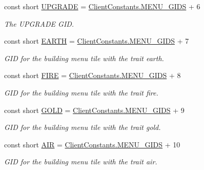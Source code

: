\begin{DoxyCompactItemize}
const short \hyperlink{classClient_1_1Common_1_1Constants_1_1BuildingMenuGid_a1bfbcae011676ac021301688aec0fb04}{U\+P\+G\+R\+A\+D\+E} = \hyperlink{classClient_1_1Common_1_1Constants_1_1ClientConstants_a4d3b0e4f36481c991c9995cb20c9347d}{Client\+Constants.\+M\+E\+N\+U\+\_\+\+G\+I\+D\+S} + 6
\begin{DoxyCompactList}\small\item\em The U\+P\+G\+R\+A\+D\+E G\+I\+D. \end{DoxyCompactList}\item 
const short \hyperlink{classClient_1_1Common_1_1Constants_1_1BuildingMenuGid_a8d1308488d4c82b22076bb64b16fbfdd}{E\+A\+R\+T\+H} = \hyperlink{classClient_1_1Common_1_1Constants_1_1ClientConstants_a4d3b0e4f36481c991c9995cb20c9347d}{Client\+Constants.\+M\+E\+N\+U\+\_\+\+G\+I\+D\+S} + 7
\begin{DoxyCompactList}\small\item\em G\+I\+D for the building menu tile with the trait earth. \end{DoxyCompactList}\item 
const short \hyperlink{classClient_1_1Common_1_1Constants_1_1BuildingMenuGid_a31920e3fef30931467501afb53df9404}{F\+I\+R\+E} = \hyperlink{classClient_1_1Common_1_1Constants_1_1ClientConstants_a4d3b0e4f36481c991c9995cb20c9347d}{Client\+Constants.\+M\+E\+N\+U\+\_\+\+G\+I\+D\+S} + 8
\begin{DoxyCompactList}\small\item\em G\+I\+D for the building menu tile with the trait fire. \end{DoxyCompactList}\item 
const short \hyperlink{classClient_1_1Common_1_1Constants_1_1BuildingMenuGid_a4ac5ec01517a920f208b4f5fd7f3b127}{G\+O\+L\+D} = \hyperlink{classClient_1_1Common_1_1Constants_1_1ClientConstants_a4d3b0e4f36481c991c9995cb20c9347d}{Client\+Constants.\+M\+E\+N\+U\+\_\+\+G\+I\+D\+S} + 9
\begin{DoxyCompactList}\small\item\em G\+I\+D for the building menu tile with the trait gold. \end{DoxyCompactList}\item 
const short \hyperlink{classClient_1_1Common_1_1Constants_1_1BuildingMenuGid_a858bb44aca4bad0b0f8873a0e66af7d7}{A\+I\+R} = \hyperlink{classClient_1_1Common_1_1Constants_1_1ClientConstants_a4d3b0e4f36481c991c9995cb20c9347d}{Client\+Constants.\+M\+E\+N\+U\+\_\+\+G\+I\+D\+S} + 10
\begin{DoxyCompactList}\small\item\em G\+I\+D for the building menu tile with the trait air. \end{DoxyCompactList}\item 

\end{DoxyCompactItemize}
